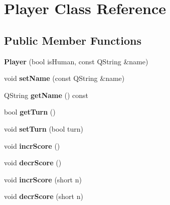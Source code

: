 \hypertarget{classPlayer}{
\section{Player Class Reference}
\label{classPlayer}
}
\subsection*{Public Member Functions}
\begin{DoxyCompactItemize}
\item 
\hypertarget{classPlayer_ad3fa280bc4061c68e91159234a6fda89}{
{\bfseries Player} (bool isHuman, const QString \&name)}
\label{classPlayer_ad3fa280bc4061c68e91159234a6fda89}

\item 
\hypertarget{classPlayer_a2433be9ff66b617c95c3b9596e36f2b7}{
void {\bfseries setName} (const QString \&name)}
\label{classPlayer_a2433be9ff66b617c95c3b9596e36f2b7}

\item 
\hypertarget{classPlayer_a3ecb2fd74c6dd0642728a78773115129}{
QString {\bfseries getName} () const }
\label{classPlayer_a3ecb2fd74c6dd0642728a78773115129}

\item 
\hypertarget{classPlayer_ae76047275583852970ca612687aded96}{
bool {\bfseries getTurn} ()}
\label{classPlayer_ae76047275583852970ca612687aded96}

\item 
\hypertarget{classPlayer_a9b0788b2af33b40eedecd69a217b7fb5}{
void {\bfseries setTurn} (bool turn)}
\label{classPlayer_a9b0788b2af33b40eedecd69a217b7fb5}

\item 
\hypertarget{classPlayer_aa6705e5625bac886428b83fbeccb0f6f}{
void {\bfseries incrScore} ()}
\label{classPlayer_aa6705e5625bac886428b83fbeccb0f6f}

\item 
\hypertarget{classPlayer_aef470c4b0aaf87a4dda83983a74dfbcc}{
void {\bfseries decrScore} ()}
\label{classPlayer_aef470c4b0aaf87a4dda83983a74dfbcc}

\item 
\hypertarget{classPlayer_a3b0fc8fa8a1d30d2e5d26b0c2e6f01a9}{
void {\bfseries incrScore} (short n)}
\label{classPlayer_a3b0fc8fa8a1d30d2e5d26b0c2e6f01a9}

\item 
\hypertarget{classPlayer_ae0e634b98c63a5eb111f9e9d786a2b9a}{
void {\bfseries decrScore} (short n)}
\label{classPlayer_ae0e634b98c63a5eb111f9e9d786a2b9a}


\end{DoxyCompactItemize}
